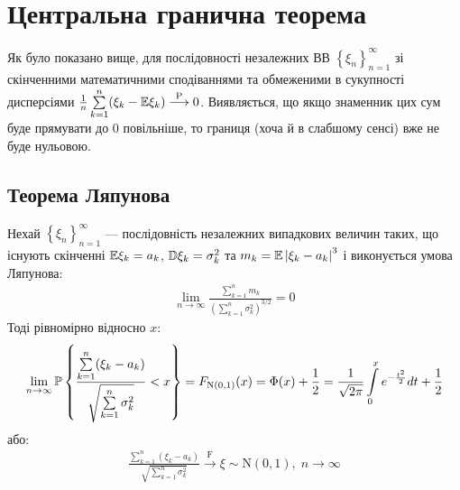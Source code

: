 \section{Центральна гранична теорема}
Як було показано вище, для послідовності незалежних ВВ 
$\left\{ \xi_n\right\}_{n=1}^\infty$ зі скінченними математичними сподіваннями та обмеженими в сукупності
дисперсіями $\frac{1}{n}\sum\limits_{k=1}^n (\xi_k - \E\xi_k) \overset{\mathrm{P}}{\longrightarrow} 0$.
Виявляється, що якщо знаменник цих сум буде прямувати до $0$ повільніше, то границя (хоча й в слабшому сенсі) вже не буде нульовою.
\subsection{Теорема Ляпунова}
\begin{theorem*}
    Нехай $\left\{ \xi_n\right\}_{n=1}^\infty$ --- послідовність незалежних випадкових величин таких, 
    що існують скінченні $\E\xi_k = a_k$, $\D\xi_k = \sigma_k^2$ та
    $m_k = \E\left|\xi_k - a_k\right|^3$ і виконується умова Ляпунова:
    \begin{gather*}
        \lim_{n \rightarrow \infty} \frac{\sum\limits_{k=1}^n m_k}{\left(
            \sum\limits_{k=1}^n \sigma_k^2
        \right)^{3/2}} = 0
    \end{gather*}
    Тоді рівномірно відносно $x$:
    \begin{gather}
        \lim_{n \rightarrow \infty} \P \left\{
            \frac{\sum\limits_{k=1}^n (\xi_k - a_k)}
            {\sqrt{\sum\limits_{k=1}^n \sigma_k^2}}
            < x
        \right\} = F_{\mathrm{N}(0, 1)}(x) = \Phi(x) + \frac{1}{2} = 
        \frac{1}{\sqrt{2\pi}} \int\limits_0^x e^{-\frac{t^2}{2}} dt + \frac{1}{2}
    \end{gather}
    або:
    \begin{gather*}
        \frac{\sum\limits_{k=1}^n (\xi_k - a_k)}
        {\sqrt{\sum\limits_{k=1}^n \sigma_k^2}}
        \overset{\mathrm{F}}{\longrightarrow} \xi \sim \mathrm{N}(0, 1),  \; n\to \infty
    \end{gather*}
\end{theorem*}
